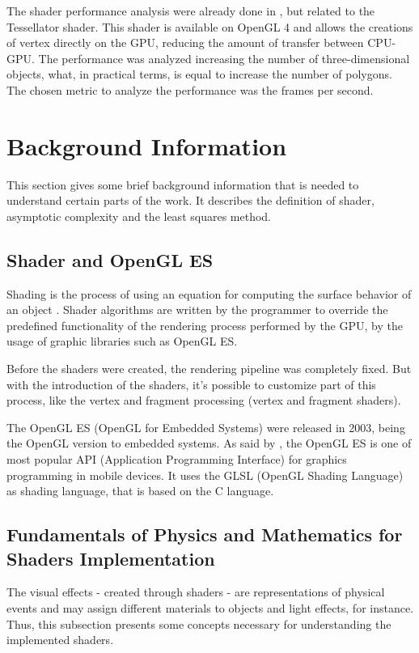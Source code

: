 \documentclass[10pt, conference, compsocconf]{IEEEtran}
\begin{document}
The shader performance analysis were already done in \cite{sbgames}, but related to the
Tessellator shader. This shader is available on OpenGL 4 and
allows the creations of vertex directly on the GPU, reducing the 
amount of transfer between CPU-GPU. The performance was analyzed increasing the number of three-dimensional
objects, what, in practical terms, is equal to increase the number of polygons. The chosen metric
to analyze the performance was the frames per second.

\section{Background Information}

This section gives some brief background information that is needed to
understand certain parts of the work. It describes the definition of shader,
asymptotic complexity and the least squares method.

\subsection{Shader and OpenGL ES}

Shading is the process of using an equation for computing the surface
behavior of an object \cite{realtime}. Shader algorithms are written by the programmer
to override the predefined functionality of the rendering process performed
by the GPU, by the usage of graphic libraries such as OpenGL ES.

Before the shaders were created, the rendering pipeline was completely fixed.
But with the introduction of the shaders, it's possible to customize part
of this process, like the vertex and fragment processing (vertex and fragment
shaders).

The OpenGL ES (OpenGL for Embedded Systems) were released in 2003, being the
OpenGL version to embedded systems. As said by \cite{guha2011}, the OpenGL ES
is one of most popular API (Application Programming Interface) for graphics 
programming in mobile devices. It uses the GLSL (OpenGL Shading Language) 
as shading language, that is based on the C language.

\subsection{Fundamentals of Physics and Mathematics for Shaders Implementation}

The visual effects - created through shaders - are representations of physical events and may assign different materials to objects and light effects, for instance.
 Thus, this subsection presents some concepts necessary for understanding the implemented shaders.
\end{document}
